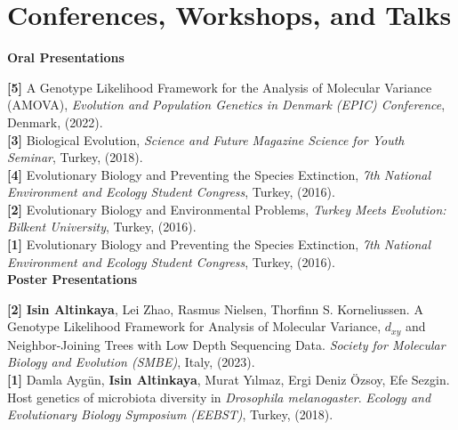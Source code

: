 \documentclass[letterpaper,10.5pt]{article}
\begin{document}
\section{Conferences, Workshops, and Talks}

\medskip
\textbf{Oral Presentations}
\medskip

\textbf{[5]} \hspace{0.42cm} {A Genotype Likelihood Framework for the Analysis of Molecular Variance (AMOVA)}, \textit{Evolution and Population Genetics in Denmark (EPIC) Conference}, Denmark, (2022). \\
\smallskip
\textbf{[3]} \hspace{0.42cm} {Biological Evolution}, \textit{Science and Future Magazine Science for Youth Seminar}, Turkey, (2018). \\
\smallskip
\textbf{[4]} \hspace{0.42cm} {Evolutionary Biology and Preventing the Species Extinction}, \textit{7th National Environment and Ecology Student Congress}, Turkey, (2016). \\
\smallskip
\textbf{[2]} \hspace{0.42cm} {Evolutionary Biology and Environmental Problems}, \textit{Turkey Meets Evolution: Bilkent University}, Turkey, (2016). \\
\smallskip
\textbf{[1]} \hspace{0.42cm} {Evolutionary Biology and Preventing the Species Extinction}, \textit{7th National Environment and Ecology Student Congress}, Turkey, (2016). \\

\medskip
\textbf{Poster Presentations}
\medskip

\textbf{[2]} \hspace{0.42cm}  \textbf{Isin Altinkaya}, Lei Zhao, Rasmus Nielsen, Thorfinn S. Korneliussen. A Genotype Likelihood Framework for Analysis of Molecular Variance, $d_{xy}$ and Neighbor-Joining Trees with Low Depth Sequencing Data. \textit{Society for Molecular Biology and Evolution (SMBE)}, Italy, (2023). \\


\textbf{[1]} \hspace{0.42cm} Damla Aygün, \textbf{Isin Altinkaya}, Murat Y{\i}lmaz, Ergi Deniz \"{O}zsoy, Efe Sezgin. Host genetics of microbiota diversity in \textit{Drosophila melanogaster}. \textit{Ecology and Evolutionary Biology Symposium (EEBST)}, Turkey, (2018). \\
\end{document}
